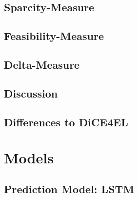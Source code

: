 \documentclass[12pt,a4paper]{report}
\begin{document}
\subsection{Sparcity-Measure}
\label{sec:sparcity}


\subsection{Feasibility-Measure}
\label{sec:feasibility}




\subsection{Delta-Measure}
\label{sec:delta}


\subsection{Discussion}


\subsection{Differences to DiCE4EL}

 

\section{Models}
\label{sec:models}

\subsection{Prediction Model: LSTM}
\label{sec:model_prediction}



% 
\end{document}
